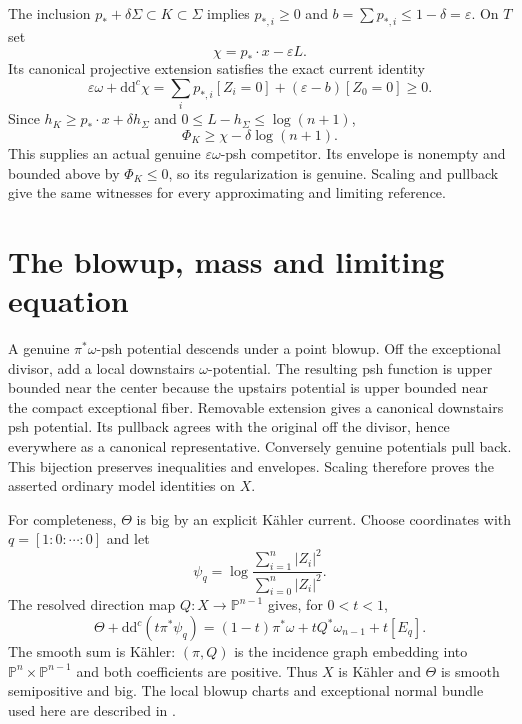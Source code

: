 \documentclass[11pt]{article}
\newcommand{\ddc}{\mathrm d\mathrm d^c}
\newcommand{\CP}{\mathbb P}
\begin{document}
The inclusion $p_*+\delta\Sigma\subset K\subset\Sigma$ implies
$p_{*,i}\ge0$ and $b=\sum p_{*,i}\le1-\delta=\varepsilon$.
On $T$ set
\[
 \chi=p_*\cdot x-\varepsilon L.
\]
Its canonical projective extension satisfies the exact current identity
\[
 \varepsilon\omega+\ddc\chi
 =\sum_i p_{*,i}[Z_i=0]+(\varepsilon-b)[Z_0=0]\ge0.
\]
Since $h_K\ge p_*\cdot x+\delta h_\Sigma$ and
$0\le L-h_\Sigma\le\log(n+1)$,
\[
 \Phi_K\ge\chi-\delta\log(n+1).
\]
This supplies an actual genuine $\varepsilon\omega$-psh competitor.
Its envelope is nonempty and bounded above by $\Phi_K\le0$, so its
regularization is genuine. Scaling and pullback give the same witnesses
for every approximating and limiting reference.

\section{The blowup, mass and limiting equation}

A genuine $\pi^*\omega$-psh potential descends under a point blowup.
Off the exceptional divisor, add a local downstairs $\omega$-potential.
The resulting psh function is upper bounded near the center because
the upstairs potential is upper bounded near the compact exceptional
fiber. Removable extension gives a canonical downstairs psh potential.
Its pullback agrees with the original off the divisor, hence everywhere
as a canonical representative. Conversely genuine potentials pull back.
This bijection preserves inequalities and envelopes. Scaling therefore
proves the asserted ordinary model identities on $X$.

For completeness, $\Theta$ is big by an explicit K\"ahler current.
Choose coordinates with $q=[1:0:\cdots:0]$ and let
\[
 \psi_q=\log\frac{\sum_{i=1}^n|Z_i|^2}{\sum_{i=0}^n|Z_i|^2}.
\]
The resolved direction map $Q:X\to\CP^{n-1}$ gives, for $0<t<1$,
\[
 \Theta+\ddc(t\pi^*\psi_q)
 =(1-t)\pi^*\omega+tQ^*\omega_{n-1}+t[E_q].
\]
The smooth sum is K\"ahler: $(\pi,Q)$ is the incidence graph embedding
into $\CP^n\times\CP^{n-1}$ and both coefficients are positive.
Thus $X$ is K\"ahler and $\Theta$ is smooth semipositive and big.
The local blowup charts and exceptional normal bundle used here are
described in \cite[VII.12]{Demailly}.
\end{document}
